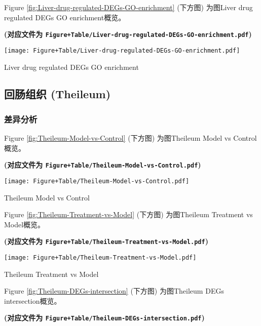 \documentclass[
]{article}
\begin{document}
Figure \ref{fig:Liver-drug-regulated-DEGs-GO-enrichment} (下方图) 为图Liver drug regulated DEGs GO enrichment概览。

\textbf{(对应文件为 \texttt{Figure+Table/Liver-drug-regulated-DEGs-GO-enrichment.pdf})}

\def\@captype{figure}
\begin{center}
\texttt{[image: Figure+Table/Liver-drug-regulated-DEGs-GO-enrichment.pdf]}
\caption{Liver drug regulated DEGs GO enrichment}\label{fig:Liver-drug-regulated-DEGs-GO-enrichment}
\end{center}

\hypertarget{ux56deux80a0ux7ec4ux7ec7-theileum}{%
\subsection{回肠组织 (Theileum)}\label{ux56deux80a0ux7ec4ux7ec7-theileum}}

\hypertarget{theil-deg}{%
\subsubsection{差异分析}\label{theil-deg}}

Figure \ref{fig:Theileum-Model-vs-Control} (下方图) 为图Theileum Model vs Control概览。

\textbf{(对应文件为 \texttt{Figure+Table/Theileum-Model-vs-Control.pdf})}

\def\@captype{figure}
\begin{center}
\texttt{[image: Figure+Table/Theileum-Model-vs-Control.pdf]}
\caption{Theileum Model vs Control}\label{fig:Theileum-Model-vs-Control}
\end{center}

Figure \ref{fig:Theileum-Treatment-vs-Model} (下方图) 为图Theileum Treatment vs Model概览。

\textbf{(对应文件为 \texttt{Figure+Table/Theileum-Treatment-vs-Model.pdf})}

\def\@captype{figure}
\begin{center}
\texttt{[image: Figure+Table/Theileum-Treatment-vs-Model.pdf]}
\caption{Theileum Treatment vs Model}\label{fig:Theileum-Treatment-vs-Model}
\end{center}

Figure \ref{fig:Theileum-DEGs-intersection} (下方图) 为图Theileum DEGs intersection概览。

\textbf{(对应文件为 \texttt{Figure+Table/Theileum-DEGs-intersection.pdf})}
\end{document}
